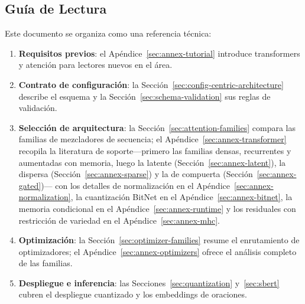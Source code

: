 \subsection{Guía de Lectura}

Este documento se organiza como una referencia técnica:
\begin{enumerate}[leftmargin=*]
    \item \textbf{Requisitos previos}: el Apéndice~\ref{sec:annex-tutorial} introduce transformers y atención para lectores nuevos en el área.
    \item \textbf{Contrato de configuración}: la Sección~\ref{sec:config-centric-architecture} describe el esquema y la Sección~\ref{sec:schema-validation} sus reglas de validación.
    \item \textbf{Selección de arquitectura}: la Sección~\ref{sec:attention-families} compara las familias de mezcladores de secuencia; el Apéndice~\ref{sec:annex-transformer} recopila la literatura de soporte---primero las familias densas, recurrentes y aumentadas con memoria, luego la latente (Sección~\ref{sec:annex-latent}), la dispersa (Sección~\ref{sec:annex-sparse}) y la de compuerta (Sección~\ref{sec:annex-gated})--- con los detalles de normalización en el Apéndice~\ref{sec:annex-normalization}, la cuantización BitNet en el Apéndice~\ref{sec:annex-bitnet}, la memoria condicional en el Apéndice~\ref{sec:annex-runtime} y los residuales con restricción de variedad en el Apéndice~\ref{sec:annex-mhc}.
    \item \textbf{Optimización}: la Sección~\ref{sec:optimizer-families} resume el enrutamiento de optimizadores; el Apéndice~\ref{sec:annex-optimizers} ofrece el análisis completo de las familias.
    \item \textbf{Despliegue e inferencia}: las Secciones~\ref{sec:quantization} y~\ref{sec:sbert} cubren el despliegue cuantizado y los embeddings de oraciones.
\end{enumerate}
